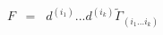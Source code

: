 \begin{equation}
F \;\; =\;\; d^{({i_{1}})} ... d^{({i_k})} {\tilde{\Gamma}}_{( i_1 ...
i_k )}
\label{eq:2.7}
\end{equation}

